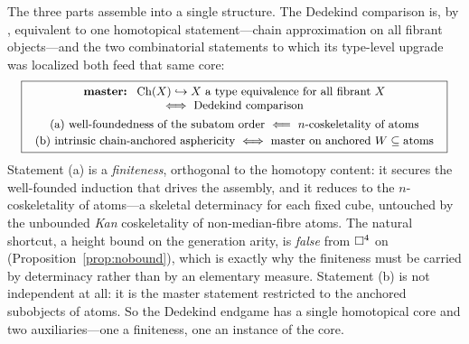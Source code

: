 
The three parts assemble into a single structure.  The Dedekind
comparison is, by \cite{PaperW}, equivalent to one homotopical
statement---chain approximation on all fibrant objects---and the two
combinatorial statements to which its type-level upgrade was localized
both feed that same core:
\[
  \small
  \boxed{\;
  \begin{array}{c}
  \textbf{master:}\ \ \operatorname{Ch}(X)\hookrightarrow X\ \text{a type equivalence
  for all fibrant }X\\
  \Longleftrightarrow\ \text{Dedekind comparison}\\[4pt]
  \text{(a) well-foundedness of the subatom order}\ \Longleftarrow\
  n\text{-coskeletality of atoms}\\[2pt]
  \text{(b) intrinsic chain-anchored asphericity}\ \Longleftrightarrow\
  \text{master on anchored }W\subseteq\text{atoms}
  \end{array}\;}
\]
Statement (a) is a \emph{finiteness}, orthogonal to the homotopy content:
it secures the well-founded induction that drives the assembly, and it
reduces to the $n$-coskeletality of atoms---a skeletal determinacy for
each fixed cube, untouched by the unbounded \emph{Kan} coskeletality of
non-median-fibre atoms.  The natural shortcut, a height bound on the
generation arity, is \emph{false} from $\square^4$ on
(Proposition~\ref{prop:nobound}), which is exactly why the finiteness
must be carried by determinacy rather than by an elementary measure.
Statement (b) is not independent at all: it is the master statement
restricted to the anchored subobjects of atoms.  So the Dedekind endgame
has a single homotopical core and two auxiliaries---one a finiteness, one
an instance of the core.

